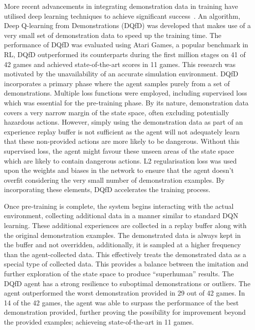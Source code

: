 More recent advancements in integrating demonstration data in training have utilised deep learning techniques to achieve significant success~\cite{deepQLearningFromDemo}.
An algorithm, Deep Q-learning from Demonstrations (DQfD) was developed that makes use of a very small set of demonstration data to speed up the training time.
The performance of DQfD was evaluated using Atari Games, a popular benchmark in RL, DQfD outperformed its counterparts during the first million stages on 41 of 42 games and achieved state-of-the-art scores in 11 games.
This research was motivated by the unavailability of an accurate simulation environment.
DQfD incorporates a primary phase where the agent samples purely from a set of demonstrations.
Multiple loss functions were employed, including supervised loss which was essential for the pre-training phase.
By its nature, demonstration data covers a very narrow margin of the state space, often excluding potentially hazardous actions.
However, simply using the demonstration data as part of an experience replay buffer is not sufficient as the agent will not adequately learn that these non-provided actions are more likely to be dangerous.
Without this supervised loss, the agent might favour these unseen areas of the state space which are likely to contain dangerous actions.
L2 regularisation loss was used upon the weights and biases in the network to ensure that the agent doesn't overfit considering the very small number of demonstration examples.
By incorporating these elements, DQfD accelerates the training process.

Once pre-training is complete, the system begins interacting with the actual environment, collecting additional data in a manner similar to standard DQN learning.
These additional experiences are collected in a replay buffer along with the original demonstration examples.
The demonstrated data is always kept in the buffer and not overridden, additionally, it is sampled at a higher frequency than the agent-collected data.
This effectively treats the demonstrated data as a special type of collected data.
This provides a balance between the imitation and further exploration of the state space to produce ``superhuman'' results.
The DQfD agent has a strong resilience to suboptimal demonstrations or outliers.
The agent outperformed the worst demonstration provided in 29 out of 42 games.
In 14 of the 42 games, the agent was able to surpass the performance of the best demonstration provided, further proving the possibility for improvement beyond the provided examples; achieveing state-of-the-art in 11 games.


